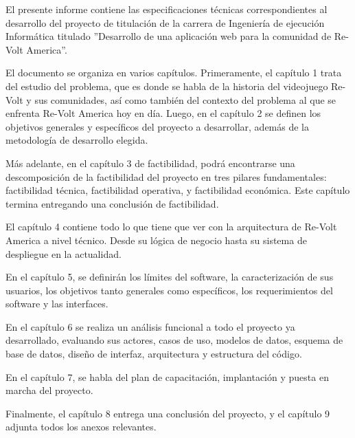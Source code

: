 El presente informe contiene las especificaciones técnicas correspondientes al desarrollo del proyecto de titulación de la carrera de Ingeniería de ejecución Informática titulado ''Desarrollo de una aplicación web para la comunidad de Re-Volt America''.

El documento se organiza en varios capítulos. Primeramente, el capítulo 1 trata del estudio del problema, que es donde se habla de la historia del videojuego Re-Volt y sus comunidades, así como también del contexto del problema al que se enfrenta Re-Volt America hoy en día. Luego, en el capítulo 2 se definen los objetivos generales y específicos del proyecto a desarrollar, además de la metodología de desarrollo elegida.

Más adelante, en el capítulo 3 de factibilidad, podrá encontrarse una descomposición de la factibilidad del proyecto en tres pilares fundamentales: factibilidad técnica, factibilidad operativa, y factibilidad económica. Este capítulo termina entregando una conclusión de factibilidad.

El capítulo 4 contiene todo lo que tiene que ver con la arquitectura de Re-Volt America a nivel técnico. Desde su lógica de negocio hasta su sistema de despliegue en la actualidad.

En el capítulo 5, se definirán los límites del software, la caracterización de sus usuarios, los objetivos tanto generales como específicos, los requerimientos del software y las interfaces.

En el capítulo 6 se realiza un análisis funcional a todo el proyecto ya desarrollado, evaluando sus actores, casos de uso, modelos de datos, esquema de base de datos, diseño de interfaz, arquitectura y estructura del código.

En el capítulo 7, se habla del plan de capacitación, implantación y puesta en marcha del proyecto.

Finalmente, el capítulo 8 entrega una conclusión del proyecto, y el capítulo 9 adjunta todos los anexos relevantes.
